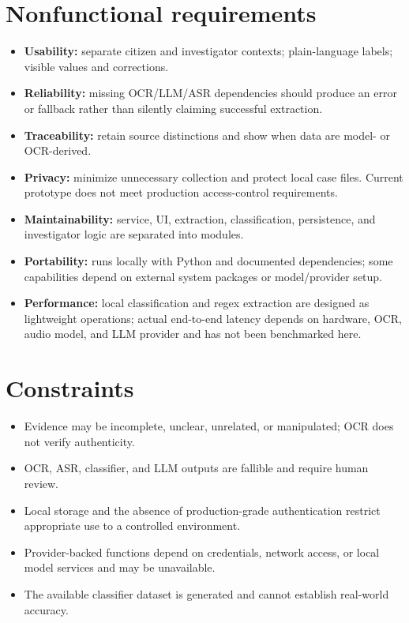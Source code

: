 \documentclass[12pt,a4paper,oneside]{report}
\begin{document}
\section{Nonfunctional requirements}
\begin{itemize}
\item \textbf{Usability:} separate citizen and investigator contexts; plain-language labels; visible values and corrections.
\item \textbf{Reliability:} missing OCR/LLM/ASR dependencies should produce an error or fallback rather than silently claiming successful extraction.
\item \textbf{Traceability:} retain source distinctions and show when data are model- or OCR-derived.
\item \textbf{Privacy:} minimize unnecessary collection and protect local case files. Current prototype does not meet production access-control requirements.
\item \textbf{Maintainability:} service, UI, extraction, classification, persistence, and investigator logic are separated into modules.
\item \textbf{Portability:} runs locally with Python and documented dependencies; some capabilities depend on external system packages or model/provider setup.
\item \textbf{Performance:} local classification and regex extraction are designed as lightweight operations; actual end-to-end latency depends on hardware, OCR, audio model, and LLM provider and has not been benchmarked here.
\end{itemize}
\section{Constraints}
\begin{itemize}
\item Evidence may be incomplete, unclear, unrelated, or manipulated; OCR does not verify authenticity.
\item OCR, ASR, classifier, and LLM outputs are fallible and require human review.
\item Local storage and the absence of production-grade authentication restrict appropriate use to a controlled environment.
\item Provider-backed functions depend on credentials, network access, or local model services and may be unavailable.
\item The available classifier dataset is generated and cannot establish real-world accuracy.
\end{itemize}
\end{document}
